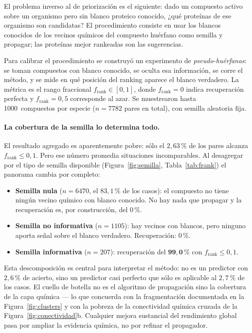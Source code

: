 \documentclass[11pt,a4paper]{article}
\newcommand{\fr}{f_{\mathrm{rank}}}
\begin{document}
El problema inverso al de priorización es el siguiente: dado un compuesto activo
sobre un organismo pero sin blanco proteico conocido, ¿qué proteínas de ese
organismo son candidatas? El procedimiento consiste en usar los blancos conocidos
de los vecinos químicos del compuesto huérfano como semilla y propagar; las
proteínas mejor rankeadas son las sugerencias.

Para calibrar el procedimiento se construyó un experimento de
\emph{pseudo-huérfanas}: se toman compuestos con blanco conocido, se oculta esa
información, se corre el método, y se mide en qué posición del ranking aparece
el blanco verdadero. La métrica es el rango fraccional $\fr \in [0,1]$, donde
$\fr = 0$ indica recuperación perfecta y $\fr = 0{,}5$ corresponde al azar. Se
muestrearon hasta 1000~compuestos por especie ($n = 7782$ pares en total), con
semilla aleatoria fija.

\paragraph{La cobertura de la semilla lo determina todo.}
El resultado agregado es aparentemente pobre: sólo el $2{,}63\,\%$ de los pares
alcanza $\fr \le 0{,}1$. Pero ese número promedia situaciones incomparables.
Al desagregar por el tipo de semilla disponible
(Figura~\ref{fig:semilla}, Tabla~\ref{tab:frank}) el panorama cambia por
completo:

\begin{itemize}
  \item \textbf{Semilla nula} ($n = 6470$, el $83{,}1\,\%$ de los casos): el
    compuesto no tiene ningún vecino químico con blanco conocido. No hay nada
    que propagar y la recuperación es, por construcción, del $0\,\%$.
  \item \textbf{Semilla no informativa} ($n = 1105$): hay vecinos con blancos,
    pero ninguno aporta señal sobre el blanco verdadero. Recuperación: $0\,\%$.
  \item \textbf{Semilla informativa} ($n = 207$): recuperación del
    $\mathbf{99{,}0\,\%}$ con $\fr \le 0{,}1$.
\end{itemize}

Esta descomposición es central para interpretar el método: no es un predictor
con $2{,}6\,\%$ de acierto, sino un predictor casi perfecto que sólo es
aplicable al $2{,}7\,\%$ de los casos. El cuello de botella no es el algoritmo
de propagación sino la cobertura de la capa química --- lo que concuerda con la
fragmentación documentada en la Figura~\ref{fig:clusters} y con la pobreza de
la conectividad química cruzada de la Figura~\ref{fig:conectividad}b. Cualquier
mejora sustancial del rendimiento global pasa por ampliar la evidencia química,
no por refinar el propagador.
\end{document}
